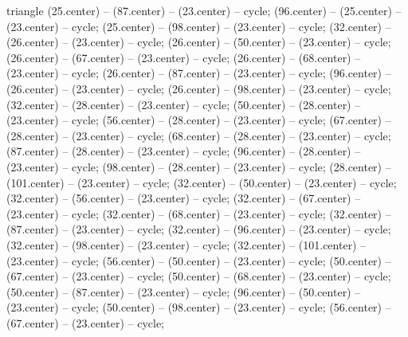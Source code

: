 \begin{pgfonlayer}{triangle}
 (25.center) -- (87.center) -- (23.center) -- cycle; 
 (96.center) -- (25.center) -- (23.center) -- cycle; 
 (25.center) -- (98.center) -- (23.center) -- cycle; 
 (32.center) -- (26.center) -- (23.center) -- cycle; 
 (26.center) -- (50.center) -- (23.center) -- cycle; 
 (26.center) -- (67.center) -- (23.center) -- cycle; 
 (26.center) -- (68.center) -- (23.center) -- cycle; 
 (26.center) -- (87.center) -- (23.center) -- cycle; 
 (96.center) -- (26.center) -- (23.center) -- cycle; 
 (26.center) -- (98.center) -- (23.center) -- cycle; 
 (32.center) -- (28.center) -- (23.center) -- cycle; 
 (50.center) -- (28.center) -- (23.center) -- cycle; 
 (56.center) -- (28.center) -- (23.center) -- cycle; 
 (67.center) -- (28.center) -- (23.center) -- cycle; 
 (68.center) -- (28.center) -- (23.center) -- cycle; 
 (87.center) -- (28.center) -- (23.center) -- cycle; 
 (96.center) -- (28.center) -- (23.center) -- cycle; 
 (98.center) -- (28.center) -- (23.center) -- cycle; 
 (28.center) -- (101.center) -- (23.center) -- cycle; 
 (32.center) -- (50.center) -- (23.center) -- cycle; 
 (32.center) -- (56.center) -- (23.center) -- cycle; 
 (32.center) -- (67.center) -- (23.center) -- cycle; 
 (32.center) -- (68.center) -- (23.center) -- cycle; 
 (32.center) -- (87.center) -- (23.center) -- cycle; 
 (32.center) -- (96.center) -- (23.center) -- cycle; 
 (32.center) -- (98.center) -- (23.center) -- cycle; 
 (32.center) -- (101.center) -- (23.center) -- cycle; 
 (56.center) -- (50.center) -- (23.center) -- cycle; 
 (50.center) -- (67.center) -- (23.center) -- cycle; 
 (50.center) -- (68.center) -- (23.center) -- cycle; 
 (50.center) -- (87.center) -- (23.center) -- cycle; 
 (96.center) -- (50.center) -- (23.center) -- cycle; 
 (50.center) -- (98.center) -- (23.center) -- cycle; 
 (56.center) -- (67.center) -- (23.center) -- cycle; 

\end{pgfonlayer}
